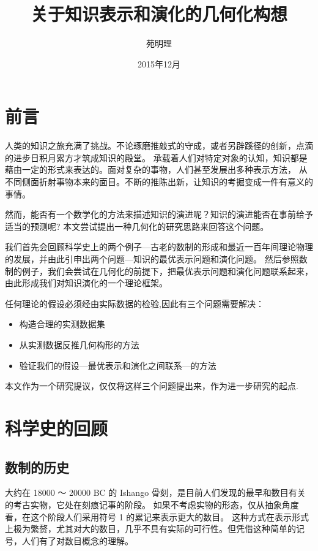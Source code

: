 \documentclass[a4paper,12pt]{article}
\title{关于知识表示和演化的几何化构想}
\author{苑明理}
\date{2015年12月}
\begin{document}
\maketitle{}

\renewcommand\contentsname{目录}
\setcounter{tocdepth}{2}
\tableofcontents

\newpage

\section{前言}

人类的知识之旅充满了挑战。不论琢磨推敲式的守成，或者另辟蹊径的创新，点滴的进步日积月累方才筑成知识的殿堂。
承载着人们对特定对象的认知，知识都是藉由一定的形式来表达的。面对复杂的事物，人们甚至发展出多种表示方法，
从不同侧面折射事物本来的面目。不断的推陈出新，让知识的考掘变成一件有意义的事情。

然而，能否有一个数学化的方法来描述知识的演进呢？知识的演进能否在事前给予适当的预测呢?
本文尝试提出一种几何化的研究思路来回答这个问题。

我们首先会回顾科学史上的两个例子—古老的数制的形成和最近一百年间理论物理的发展，并由此引申出两个问题—知识的最优表示问题和演化问题。
然后参照数制的例子，我们会尝试在几何化的前提下，把最优表示问题和演化问题联系起来，由此形成我们对知识演化的一个理论框架。

任何理论的假设必须经由实际数据的检验,因此有三个问题需要解决：
\begin{itemize}
\item 构造合理的实测数据集
\item 从实测数据反推几何构形的方法
\item 验证我们的假设—最优表示和演化之间联系—的方法
\end{itemize}

本文作为一个研究提议，仅仅将这样三个问题提出来，作为进一步研究的起点.

\newpage

\section{科学史的回顾}

\subsection{数制的历史}

大约在 18000 ～ 20000 BC 的 Ishango 骨刻，是目前人们发现的最早和数目有关的考古实物，它处在刻痕记事的阶段。
如果不考虑实物的形态，仅从抽象角度看，在这个阶段人们采用符号 1 的累记来表示更大的数目。
这种方式在表示形式上极为繁赘，尤其对大的数目，几乎不具有实际的可行性。但凭借这种简单的记号，人们有了对数目概念的理解。
\end{document}

